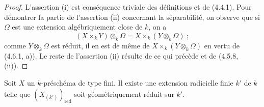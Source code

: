 \begin{proof}
L'assertion (i) est conséquence triviale des définitions et de (4.4.1). Pour
démontrer la partie de l'assertion (ii) concernant la séparabilité, on observe
que si $\Omega$ est une extension algébriquement close de $k$, on a
\[
(X\times_k Y)\otimes_k\Omega=X\times_k(Y\otimes_k\Omega)~;
\]
comme $Y\otimes_k\Omega$ est réduit, il en est de même de
$X\times_k(Y\otimes_k\Omega)$ en vertu de (4.6.1, a)). Le reste de l'assertion
(ii) résulte de ce qui précède et de (4.5.8, (ii)).
\end{proof}

\begin{proposition}[4.6.6]
\label{IV.2.4.6.6-fr}
Soit $X$ un $k$-préschéma de type fini. Il existe une extension radicielle finie
$k'$ de $k$ telle que $(X_{(k')})_{\mathrm{red}}$ soit géométriquement réduit
sur $k'$.
\end{proposition}

